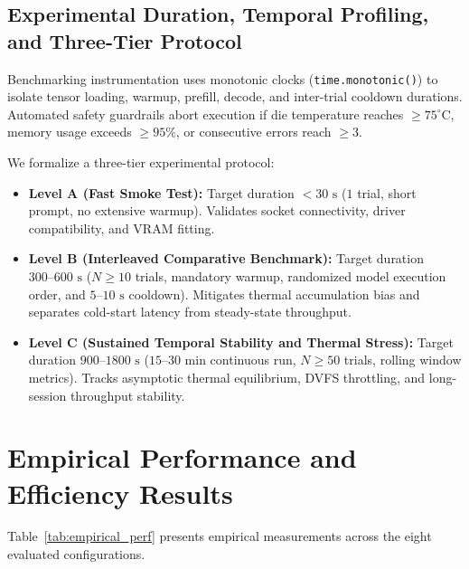 \documentclass[10pt,a4paper,twocolumn]{article}
\begin{document}
\subsection{Experimental Duration, Temporal Profiling, and Three-Tier Protocol}

Benchmarking instrumentation uses monotonic clocks (\texttt{time.monotonic()}) to isolate tensor loading, warmup, prefill, decode, and inter-trial cooldown durations. Automated safety guardrails abort execution if die temperature reaches $\ge 75^\circ\text{C}$, memory usage exceeds $\ge 95\%$, or consecutive errors reach $\ge 3$.

We formalize a three-tier experimental protocol:
\begin{itemize}[leftmargin=1.5em,itemsep=0.2em]
    \item \textbf{Level A (Fast Smoke Test):} Target duration $< 30\text{ s}$ ($1$ trial, short prompt, no extensive warmup). Validates socket connectivity, driver compatibility, and VRAM fitting.
    \item \textbf{Level B (Interleaved Comparative Benchmark):} Target duration $300\text{--}600\text{ s}$ ($N \ge 10$ trials, mandatory warmup, randomized model execution order, and $5\text{--}10\text{ s}$ cooldown). Mitigates thermal accumulation bias and separates cold-start latency from steady-state throughput.
    \item \textbf{Level C (Sustained Temporal Stability and Thermal Stress):} Target duration $900\text{--}1800\text{ s}$ ($15\text{--}30\text{ min}$ continuous run, $N \ge 50$ trials, rolling window metrics). Tracks asymptotic thermal equilibrium, DVFS throttling, and long-session throughput stability.
\end{itemize}

\section{Empirical Performance and Efficiency Results}

Table~\ref{tab:empirical_perf} presents empirical measurements across the eight evaluated configurations.
\end{document}
